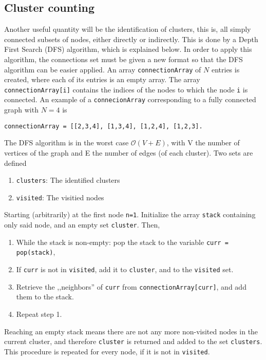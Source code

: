 \subsection{Cluster counting}

Another useful quantity will be the identification of clusters, this is, all simply connected subsets of nodes, either directly or indirectly. This is done by a Depth First Search (DFS) algorithm, which is explained below.
In order to apply this algorithm, the connections set must be given a new format so that the DFS algorithm can be easier applied. An array \texttt{connectionArray} of $N$ entries is created, where each of its entries is an empty array. The array \texttt{connectionArray[i]} contains the indices of the nodes to which the node \texttt{i} is connected. An example of a \texttt{connecionArray} corresponding to a fully connected graph with $N=4$ is
\begin{lstlisting}
connectionArray = [[2,3,4], [1,3,4], [1,2,4], [1,2,3].
\end{lstlisting}

The DFS algorithm is in the worst case $\mathcal{O}(V + E)$, with V the number of vertices of the graph and E the number of edges (of each cluster).  Two sets are defined
\begin{enumerate}
	\item \texttt{clusters}: The identified clusters
	\item \texttt{visited}: The visitied nodes
\end{enumerate}

Starting (arbitrarily) at the first node \texttt{n=1}. Initialize the array \texttt{stack} containing only said node, and an empty set \texttt{cluster}. Then,
\begin{enumerate}
	\item While the stack is non-empty: pop the stack to the variable \texttt{curr = pop(stack)},
	\item  If \texttt{curr} is not in \texttt{visited}, add it to \texttt{cluster}, and to the \texttt{visited} set.
	\item Retrieve the ,,neighbors'' of \texttt{curr} from \texttt{connectionArray[curr]}, and add them to the stack.
	\item Repeat step 1.
\end{enumerate}
Reaching an empty stack means there are not any more non-visited nodes in the current cluster, and therefore \texttt{cluster} is returned and added to the set \texttt{clusters}.
This procedure is repeated for every node, if it is not in \texttt{visited}.

